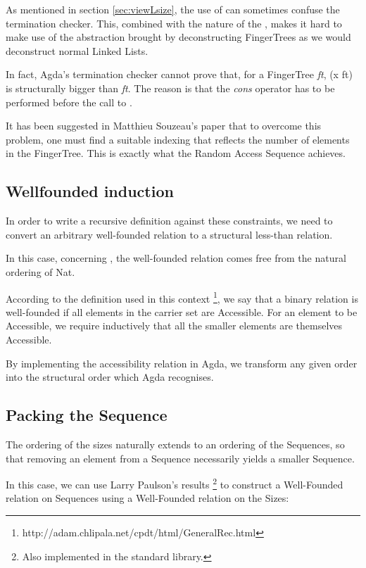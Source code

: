 \documentclass[12pt,twoside,notitlepage]{report}
\begin{document}
As mentioned in section \ref{sec:viewLsize}, the use of  can sometimes confuse the termination checker. This, combined with the nature of the , makes it hard to make use of the abstraction brought by deconstructing FingerTrees as we would deconstruct normal Linked Lists.

In fact, Agda's termination checker cannot prove that, for a FingerTree \textit{ft},  (x  ft) is structurally bigger than \textit{ft}. The reason is that the \textit{cons} operator has to be performed before the call to .
 
It has been suggested in Matthieu Souzeau's paper \cite{coq} that to overcome this problem, one must find a suitable indexing that reflects the number of elements in the FingerTree. This is exactly what the Random Access Sequence achieves.

\subsection{Wellfounded induction}

In order to write a recursive definition against these constraints, we need to convert an arbitrary well-founded relation to a structural less-than relation. 

In this case, concerning , the well-founded relation comes free from the natural ordering of Nat. 

According to the definition used in this context \footnote{http://adam.chlipala.net/cpdt/html/GeneralRec.html}, we say that a binary relation is well-founded if all elements in the carrier set are Accessible. For an element to be Accessible, we require inductively that all the smaller elements are themselves Accessible.

By implementing the accessibility relation in Agda, we transform any given order into the structural order which Agda recognises.

\subsection{Packing the Sequence}

The ordering of the sizes naturally extends to an ordering of the Sequences, so that removing an element from a Sequence necessarily yields a smaller Sequence.

In this case, we can use Larry Paulson's results \footnote{Also implemented in the standard library.} to construct a Well-Founded relation on Sequences using a Well-Founded relation on the Sizes: \cite{ml}
\end{document}
